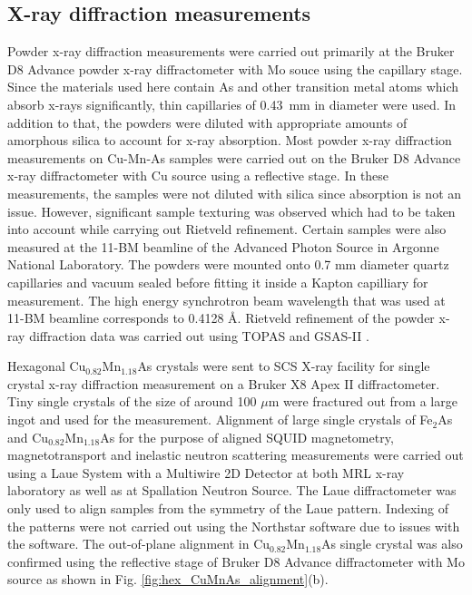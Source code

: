\documentclass[10pt,doublespacing,edeposit]{uiucthesis2020}
\begin{document}
\begin{mainmatter}
\subsection{X-ray diffraction measurements}


Powder x-ray diffraction measurements were carried out primarily at the Bruker D8 Advance powder x-ray diffractometer with Mo souce using the capillary stage. Since the materials used here contain As and other transition metal atoms which absorb x-rays significantly, thin capillaries of 0.43~mm in diameter were used. In addition to that, the powders were diluted with appropriate amounts of amorphous silica to account for x-ray absorption. Most powder x-ray diffraction measurements on Cu-Mn-As samples were carried out on the Bruker D8 Advance x-ray diffractometer with Cu source using a reflective stage. In these measurements, the samples were not diluted with silica since absorption is not an issue. However, significant sample texturing was observed which had to be taken into account while carrying out Rietveld refinement. Certain samples were also measured at the 11-BM beamline of the Advanced Photon Source in Argonne National Laboratory. The powders were mounted onto 0.7 mm diameter quartz capillaries and vacuum sealed before fitting it inside a Kapton capilliary for measurement. The high energy synchrotron beam wavelength that was used at 11-BM beamline corresponds to 0.4128 \AA. Rietveld refinement of the powder x-ray diffraction data was carried out using \textsc{TOPAS} and \textsc{GSAS-II} \cite{Coelho:jo5037,Toby:aj5212}.

Hexagonal Cu$_{0.82}$Mn$_{1.18}$As crystals were sent to SCS X-ray facility for single crystal x-ray diffraction measurement on a Bruker X8 Apex II diffractometer. Tiny single crystals of the size of around 100 $\mu$m were fractured out from a large ingot and used for the measurement. Alignment of large single crystals of Fe$_2$As and Cu$_{0.82}$Mn$_{1.18}$As for the purpose of aligned SQUID magnetometry, magnetotransport and inelastic neutron scattering measurements were carried out using a Laue System with a Multiwire 2D Detector at both MRL x-ray laboratory as well as at Spallation Neutron Source. The Laue diffractometer was only used to align samples from the symmetry of the Laue pattern. Indexing of the patterns were not carried out using the Northstar software due to issues with the software. The out-of-plane alignment in Cu$_{0.82}$Mn$_{1.18}$As single crystal was also confirmed using the reflective stage of Bruker D8 Advance diffractometer with Mo source as shown in Fig. \ref{fig:hex_CuMnAs_alignment}(b).


\end{mainmatter}
\end{document}
